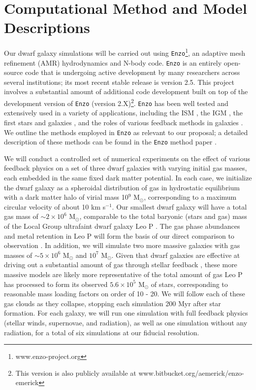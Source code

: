 \documentclass[11pt]{article}
\newcommand{\eg}{e.g.,}
\begin{document}
\section{Computational Method and Model Descriptions}

Our dwarf galaxy simulations will be carried out using \texttt{Enzo}\footnote{www.enzo-project.org}, an adaptive mesh refinement (AMR) hydrodynamics and N-body code. \texttt{Enzo} is an entirely open-source code that is undergoing active development by many researchers across several institutions; its most recent stable release is version 2.5. This project involves a substantial amount of additional code development built on top of the development version of \texttt{Enzo} (version 2.X)\footnote{This version is also publicly available at www.bitbucket.org/aemerick/enzo-emerick}. \texttt{Enzo} has been well tested and extensively used in a variety of applications, including the ISM \citep{2005MNRAS.356..737S, 2008ApJ...673..810T}, the IGM \citep{2000ApJ...534...57B, 2001ApJ...561L..31F}, the first stars and galaxies \citep[\eg][]{Wise2012a, WiseAbel2012, Wise2014}, and the roles of various feedback methods in galaxies \citep[\eg][]{Simpson2015, SalemBryan2014, Goldbaum2016, Forbes2016}. We outline the methods employed in \texttt{Enzo} as relevant to our proposal; a detailed description of these methods can be found in the \texttt{Enzo} method paper \citep{Enzo2014}. 

We will conduct a controlled set of numerical experiments on the effect of various feedback physics on a set of three dwarf galaxies with varying initial gas masses, each embedded in the same fixed dark matter potential. In each case, we initialize the dwarf galaxy as a spheroidal distribution of gas in hydrostatic equilibrium with a dark matter halo of virial mass 10$^{9}$ M$_{\odot}$, corresponding to a maximum circular velocity of about 10 km s$^{-1}$. Our smallest dwarf galaxy will have a total gas mass of $\sim 2 \times 10^{6}$ M$_{\odot}$, comparable to the total baryonic (stars and gas) mass of the Local Group ultrafaint dwarf galaxy Leo P \citep{McQuinn2013, Giovanelli2013, Skillman2013, McQuinn2015}. The gas phase abundances and metal retention in Leo P will form the basis of our direct comparison to observation \citep{McQuinn2015}. In addition, we will simulate two more massive galaxies with gas masses of $\sim 5 \times 10^{6}$ M$_{\odot}$ and $10^{7}$ M$_{\odot}$. Given that dwarf galaxies are effective at driving out a substantial amount of gas through stellar feedback \citep[e.g.][]{MacLowFerrara1999}, these more massive models are likely more representative of the total amount of gas Leo P has processed to form its observed $5.6\times 10^{5}$ M$_{\odot}$ of stars, corresponding to reasonable mass loading factors on order of 10 - 20. We will follow each of these gas clouds as they collapse, stopping each simulation 200 Myr after star formation. For each galaxy, we will run one simulation with full feedback physics (stellar winds, supernovae, and radiation), as well as one simulation without any radiation, for a total of six simulations at our fiducial resolution.
\end{document}

